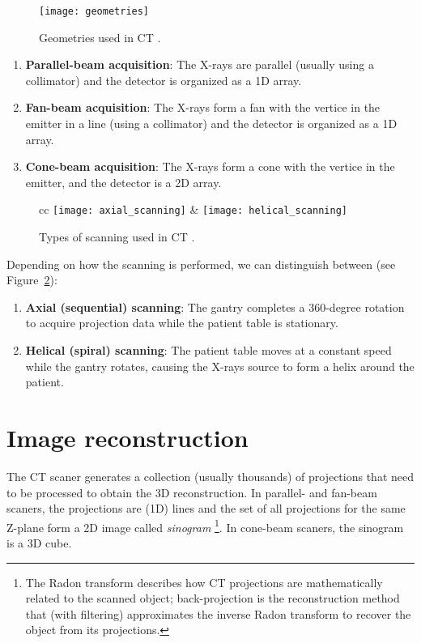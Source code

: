 \begin{figure}
  \centering
  \texttt{[image: geometries]}
  \caption{Geometries used in CT \cite{takase2025CT}.\label{fig:CT_geometries}}
\end{figure}

\begin{enumerate}
\item \textbf{Parallel-beam acquisition}: The X-rays are parallel
  (usually using a collimator) and the detector is organized as a 1D
  array.

\item \textbf{Fan-beam acquisition}: The X-rays form a fan with the vertice in the emitter
  in a line (using a collimator) and the detector is organized as a 1D
  array.

\item \textbf{Cone-beam acquisition}: The X-rays form a cone with the
  vertice in the emitter, and the detector is a 2D array.
  
\end{enumerate}

\begin{figure}
  \centering
  \begin{table}{cc}
    \texttt{[image: axial\_scanning]} & \texttt{[image: helical\_scanning]}
  \end{table}
  \caption{Types of scanning used in CT \cite{abdulla2025acquiring1}.\label{fig:scannings}}
\end{figure}

Depending on how the scanning is performed, we can distinguish between
(see Figure~\ref{fig:scannings}):

\begin{enumerate}
\item \textbf{Axial (sequential) scanning}:
  The gantry completes a 360-degree rotation to acquire projection
  data while the patient table is stationary. 

\item \textbf{Helical (spiral) scanning}: The patient table moves
  at a constant speed while the gantry rotates, causing the X-rays
  source to form a helix around the patient.
\end{enumerate}

\section{Image reconstruction}
The CT scaner generates a collection (usually thousands) of
projections that need to be processed to obtain the 3D
reconstruction. In parallel- and fan-beam scaners, the projections are
(1D) lines and the set of all projections for the same Z-plane form a
2D image called \emph{sinogram}
\cite{wikipedia2025radom_transform}\footnote{The Radon transform
  describes how CT projections are mathematically related to the
  scanned object; back-projection is the reconstruction method that
  (with filtering) approximates the inverse Radon transform to recover
  the object from its projections.}. In cone-beam scaners, the
sinogram is a 3D cube.

